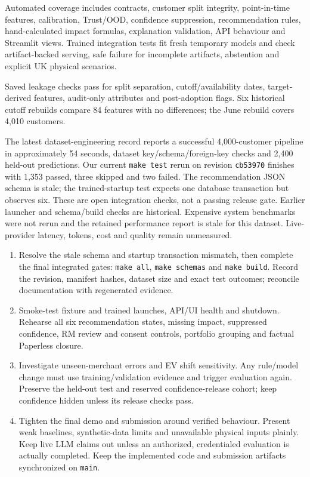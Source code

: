 \documentclass[10pt,a4paper]{article}
\newcommand{\sect}[1]{\vspace{5pt}{\large\bfseries\color{greenr}#1}\par\vspace{1pt}}
\begin{document}
\sect{3\quad Progress on testing}
Automated coverage includes contracts, customer split integrity, point-in-time features, calibration, Trust/OOD, confidence suppression, recommendation rules, hand-calculated impact formulas, explanation validation, API behaviour and Streamlit views. Trained integration tests fit fresh temporary models and check artifact-backed serving, safe failure for incomplete artifacts, abstention and explicit UK physical scenarios.

Saved leakage checks pass for split separation, cutoff/availability dates, target-derived features, audit-only attributes and post-adoption flags. Six historical cutoff rebuilds compare 84 features with no differences; the June rebuild covers 4,010 customers.

The latest dataset-engineering record reports a successful 4,000-customer pipeline in approximately 54 seconds, dataset key/schema/foreign-key checks and 2,400 held-out predictions. Our current \texttt{make test} rerun on revision \texttt{cb53970} finishes with 1,353 passed, three skipped and two failed. The recommendation JSON schema is stale; the trained-startup test expects one database transaction but observes six. These are open integration checks, not a passing release gate. Earlier launcher and schema/build checks are historical. Expensive system benchmarks were not rerun and the retained performance report is stale for this dataset. Live-provider latency, tokens, cost and quality remain unmeasured.

\sect{4\quad Plan for the remaining time}
\begin{enumerate}[leftmargin=18pt,itemsep=4pt,topsep=3pt]
\item Resolve the stale schema and startup transaction mismatch, then complete the final integrated gates: \texttt{make all}, \texttt{make schemas} and \texttt{make build}. Record the revision, manifest hashes, dataset size and exact test outcomes; reconcile documentation with regenerated evidence.
\item Smoke-test fixture and trained launches, API/UI health and shutdown. Rehearse all six recommendation states, missing impact, suppressed confidence, RM review and consent controls, portfolio grouping and factual Paperless closure.
\item Investigate unseen-merchant errors and EV shift sensitivity. Any rule/model change must use training/validation evidence and trigger evaluation again. Preserve the held-out test and reserved confidence-release cohort; keep confidence hidden unless its release checks pass.
\item Tighten the final demo and submission around verified behaviour. Present weak baselines, synthetic-data limits and unavailable physical inputs plainly. Keep live LLM claims out unless an authorized, credentialed evaluation is actually completed. Keep the implemented code and submission artifacts synchronized on \texttt{main}.
\end{enumerate}
\end{document}
